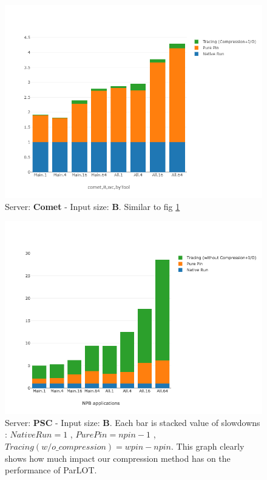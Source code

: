 \begin{figure}[!t]
\centering
\includegraphics[width=5in]{figs.comet/comet_chartDet_B_wc_byTool_p3_5.png}
\caption{Server: \textbf{Comet} - Input size: \textbf{B}. Similar to fig \ref{chartDet_B_wc_byTool_p3_5}}
\label{chartDet_B_wc_byTool_p3_5}
\end{figure}

\begin{figure}[!t]
\centering
\includegraphics[width=5in]{figs.psc/chartDet_B_woc_byTool_p3_5.png}
\caption{ Server: \textbf{PSC} - Input size: \textbf{B}. Each bar is stacked value of slowdowns : $Native Run = 1$ , $Pure Pin = npin - 1$ , $Tracing (w/o \_compression) = wpin - npin$.
This graph clearly shows how much impact our compression method has on the performance of ParLOT.
}
\label{chartDet_B_woc_byTool_p3_5}
\end{figure}


